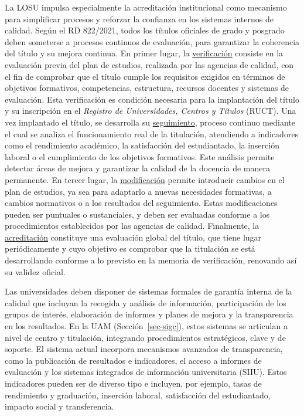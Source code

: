 \documentclass[
  11pt,
  a4paper,
  twoside]{scrreprt}
\begin{document}
La LOSU impulsa especialmente la acreditación institucional como
mecanismo para simplificar procesos y reforzar la confianza en los
sistemas internos de calidad. Según el RD 822/2021, todos los títulos
oficiales de grado y posgrado deben someterse a procesos continuos de
evaluación, para garantizar la coherencia del título y su mejora
continua. En primer lugar, la \ul{verificación} consiste en la
evaluación previa del plan de estudios, realizada por las agencias de
calidad, con el fin de comprobar que el título cumple los requisitos
exigidos en términos de objetivos formativos, competencias, estructura,
recursos docentes y sistemas de evaluación. Esta verificación es
condición necesaria para la implantación del título y su inscripción en
el \emph{Registro de Universidades, Centros y Títulos} (RUCT). Una vez
implantado el título, se desarrolla su \ul{seguimiento}, proceso
continuo mediante el cual se analiza el funcionamiento real de la
titulación, atendiendo a indicadores como el rendimiento académico, la
satisfacción del estudiantado, la inserción laboral o el cumplimiento de
los objetivos formativos. Este análisis permite detectar áreas de mejora
y garantizar la calidad de la docencia de manera permanente. En tercer
lugar, la \ul{modificación} permite introducir cambios en el plan de
estudios, ya sea para adaptarlo a nuevas necesidades formativas, a
cambios normativos o a los resultados del seguimiento. Estas
modificaciones pueden ser puntuales o sustanciales, y deben ser
evaluadas conforme a los procedimientos establecidos por las agencias de
calidad. Finalmente, la \ul{acreditación} constituye una evaluación
global del título, que tiene lugar periódicamente y cuyo objetivo es
comprobar que la titulación se está desarrollando conforme a lo previsto
en la memoria de verificación, renovando así su validez oficial.

Las universidades deben disponer de sistemas formales de garantía
interna de la calidad que incluyan la recogida y análisis de
información, participación de los grupos de interés, elaboración de
informes y planes de mejora y la transparencia en los resultados. En la
UAM (Sección~\ref{sec-sigc}), estos sistemas se articulan a nivel de
centro y titulación, integrando procedimientos estratégicos, clave y de
soporte. El sistema actual incorpora mecanismos avanzados de
transparencia, como la publicación de resultados e indicadores, el
acceso a informes de evaluación y los sistemas integrados de información
universitaria (SIIU). Estos indicadores pueden ser de diverso tipo e
incluyen, por ejemplo, tasas de rendimiento y graduación, inserción
laboral, satisfacción del estudiantado, impacto social y transferencia.
\end{document}
